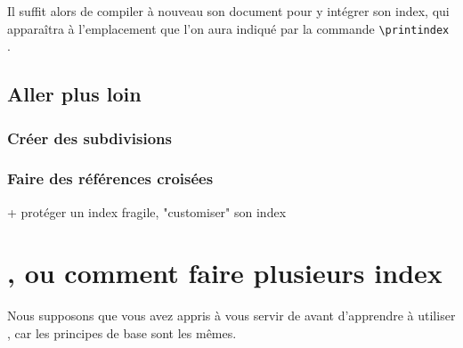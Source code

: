 Il suffit alors de compiler à nouveau son document pour y intégrer son index, qui apparaîtra à l'emplacement que l'on aura indiqué par la commande  \verb|\printindex |.


\subsection{Aller plus loin}
\subsubsection{Créer des subdivisions}
\subsubsection{Faire des références croisées}

+ protéger un index fragile, "customiser" son index

\section{, ou comment faire plusieurs index}

\begin{prealable}
Nous supposons que vous avez appris à vous servir de  avant d'apprendre à utiliser , car les principes de base sont les mêmes.
\end{prealable}

